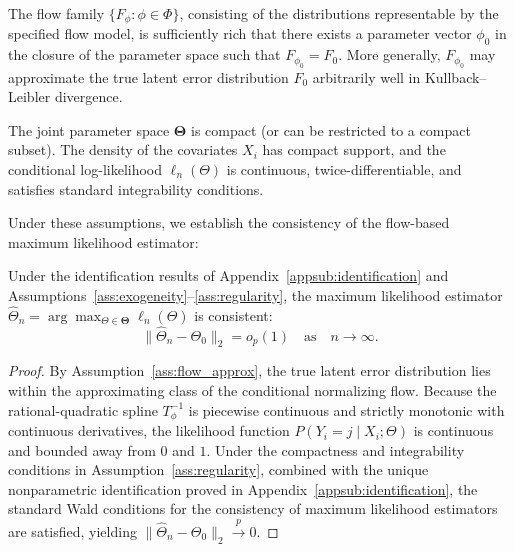 \documentclass{article}
\numberwithin{figure}{section}
\numberwithin{table}{section}
\numberwithin{equation}{section}
\begin{document}
\begin{assumption}
  The flow family \(\{F_\phi : \phi \in \Phi\}\), consisting of the distributions representable by the specified flow model, is sufficiently rich that there exists a parameter vector \(\phi_0\) in the closure of the parameter space such that \(F_{\phi_0}=F_0\). More generally, \(F_{\phi_0}\) may approximate the true latent error distribution \(F_0\) arbitrarily well in Kullback–Leibler divergence.
\label{ass:flow_approx}
\end{assumption}

\begin{assumption}
The joint parameter space $\boldsymbol{\Theta}$ is compact (or can be restricted to a compact subset). The density of the covariates $X_i$ has compact support, and the conditional log-likelihood $\ell_n(\Theta)$ is continuous, twice-differentiable, and satisfies standard integrability conditions.
\label{ass:regularity}
\end{assumption}

Under these assumptions, we establish the consistency of the flow-based maximum likelihood estimator:

\begin{theorem}
Under the identification results of Appendix~\ref{appsub:identification} and Assumptions~\ref{ass:exogeneity}--\ref{ass:regularity}, the maximum likelihood estimator $\widehat{\Theta}_n = \arg\max_{\Theta \in \boldsymbol{\Theta}} \ell_n(\Theta)$ is consistent:
\begin{equation}
\|\widehat{\Theta}_n - \Theta_0\|_2 = o_p(1) \quad \text{as} \quad n \to \infty.
\end{equation}
\end{theorem}

\begin{proof}
By Assumption~\ref{ass:flow_approx}, the true latent error distribution lies within the approximating class of the conditional normalizing flow. Because the rational-quadratic spline $T_\phi^{-1}$ is piecewise continuous and strictly monotonic with continuous derivatives, the likelihood function $P(Y_i = j \mid X_i; \Theta)$ is continuous and bounded away from $0$ and $1$. Under the compactness and integrability conditions in Assumption~\ref{ass:regularity}, combined with the unique nonparametric identification proved in Appendix~\ref{appsub:identification}, the standard Wald conditions for the consistency of maximum likelihood estimators are satisfied, yielding $\|\widehat{\Theta}_n - \Theta_0\|_2 \xrightarrow{p} 0$.
\end{proof}
\end{document}
